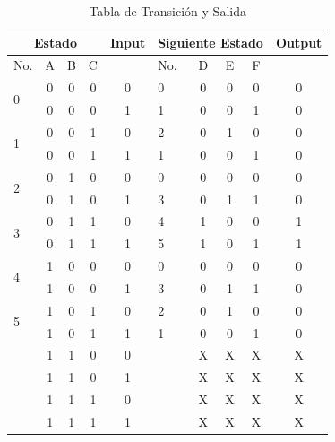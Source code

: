 \documentclass[11pt,letterpaper]{article}
\begin{document}
\newpage
\begin{table}[h]
\centering
\caption{Tabla de Transición y Salida}
\vspace{0.2cm}
\label{tab_output}
\begin{tabular}{|l|c|c|c|c||l|c|c|c|c|}
\hline
\multicolumn{4}{|c|}{Estado}   & Input & \multicolumn{4}{l|}{Siguiente Estado} & Output \\ \hline
No.                & A & B & C &       & No.       & D       & E      & F      &        \\ \hline
\multirow{2}{*}{0} & 0 & 0 & 0 & 0     & 0         & 0       & 0      & 0      & 0      \\ \cline{2-10} 
                   & 0 & 0 & 0 & 1     & 1         & 0       & 0      & 1      & 0      \\ \hline
\multirow{2}{*}{1} & 0 & 0 & 1 & 0     & 2         & 0       & 1      & 0      & 0      \\ \cline{2-10} 
                   & 0 & 0 & 1 & 1     & 1         & 0       & 0      & 1      & 0      \\ \hline
\multirow{2}{*}{2} & 0 & 1 & 0 & 0     & 0         & 0       & 0      & 0      & 0      \\ \cline{2-10} 
                   & 0 & 1 & 0 & 1     & 3         & 0       & 1      & 1      & 0      \\ \hline
\multirow{2}{*}{3} & 0 & 1 & 1 & 0     & 4         & 1       & 0      & 0      & 1      \\ \cline{2-10} 
                   & 0 & 1 & 1 & 1     & 5         & 1       & 0      & 1      & 1      \\ \hline
\multirow{2}{*}{4} & 1 & 0 & 0 & 0     & 0         & 0       & 0      & 0      & 0      \\ \cline{2-10} 
                   & 1 & 0 & 0 & 1     & 3         & 0       & 1      & 1      & 0      \\ \hline
\multirow{2}{*}{5} & 1 & 0 & 1 & 0     & 2         & 0       & 1      & 0      & 0      \\ \cline{2-10} 
                   & 1 & 0 & 1 & 1     & 1         & 0       & 0      & 1      & 0      \\ \hline
\multirow{2}{*}{}  & 1 & 1 & 0 & 0     &           & X       & X      & X      & X      \\ \cline{2-10} 
                   & 1 & 1 & 0 & 1     &           & X       & X      & X      & X      \\ \hline
\multirow{2}{*}{}  & 1 & 1 & 1 & 0     &           & X       & X      & X      & X      \\ \cline{2-10} 
                   & 1 & 1 & 1 & 1     &           & X       & X      & X      & X      \\ \hline
\end{tabular}
\end{table}
\newpage
\end{document}
